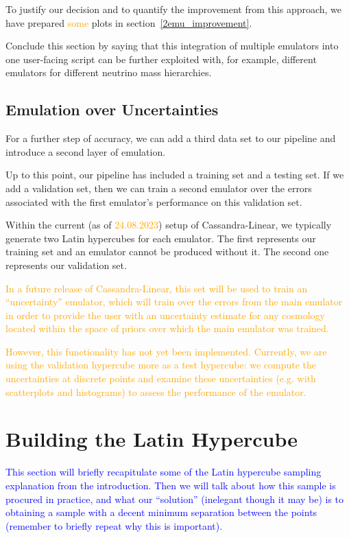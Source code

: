 To justify our decision and to quantify the improvement from this approach, we
have prepared \textcolor{orange}{some} plots in section~\ref{2emu_improvement}.

Conclude this section by saying that this integration of multiple emulators into one user-facing script can be further exploited with, for example, different emulators for different neutrino mass hierarchies.

\subsection{Emulation over Uncertainties}

For a further step of accuracy, we can add a third data set to our pipeline
and introduce a second layer of emulation.

Up to this point, our pipeline has included a training set and a testing set.
If we add a validation set, then we can train a second emulator over the
errors associated with the first emulator's performance on this validation
set.

Within the current (as of \textcolor{orange}{24.08.2023}) setup of
Cassandra-Linear, we typically generate two Latin hypercubes for each
emulator. The first represents our training set and an emulator cannot be
produced without it. The second one represents our validation set.

\textcolor{orange}{In a future
release of Cassandra-Linear, this set will be used to train an ``uncertainty''
emulator, which will train over the errors from the main emulator in order to
provide the user with an uncertainty estimate for any cosmology located within 
the space of priors over which the main emulator was trained.} 

\textcolor{orange}{However, this functionality has not yet been implemented. 
Currently, we are 
using the validation hypercube more as a test hypercube: we compute the uncertainties at discrete points and examine these uncertainties (e.g. with
scatterplots and histograms) to assess the performance of the emulator.}

\section{Building the Latin Hypercube}
\label{sec: build_lhc}


\textcolor{blue}{This section will briefly recapitulate some of the Latin hypercube sampling
explanation from the introduction. Then we will talk about how this sample is
procured in practice, and what our ``solution'' (inelegant though it may be)
is to obtaining a sample with a decent minimum separation between the points
(remember to briefly repeat why this is important).}

